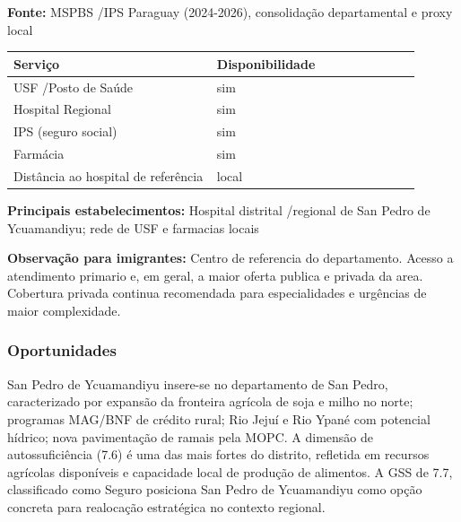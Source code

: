 \textbf{Fonte:} MSPBS /\allowbreak  IPS Paraguay (2024-2026), consolidação
departamental e proxy local

{\def\LTcaptype{none} %
\begin{longtable}{@{}>{\raggedright\arraybackslash}p{0.45\linewidth} >{\raggedright\arraybackslash}p{0.45\linewidth}@{}}
\toprule\noalign{}
Serviço & Disponibilidade \\
\midrule\noalign{}
\endhead
\bottomrule\noalign{}
\endlastfoot
USF /\allowbreak  Posto de Saúde & sim \\
Hospital Regional & sim \\
IPS (seguro social) & sim \\
Farmácia & sim \\
Distância ao hospital de referência & local \\
\end{longtable}
}

\textbf{Principais estabelecimentos:} Hospital distrital /\allowbreak  regional de
San Pedro de Ycuamandiyu; rede de USF e farmacias locais

\textbf{Observação para imigrantes:} Centro de referencia do
departamento. Acesso a atendimento primario e, em geral, a maior oferta
publica e privada da area. Cobertura privada continua recomendada para
especialidades e urgências de maior complexidade.
\newpage

\subsubsection*{Oportunidades}\label{oport-san-pedro-de-ycuamandiyu-0201}
San Pedro de Ycuamandiyu insere-se no departamento de San Pedro, caracterizado por expansão da fronteira agrícola de soja e milho no norte; programas MAG/BNF de crédito rural; Rio Jejuí e Rio Ypané com potencial hídrico; nova pavimentação de ramais pela MOPC. A dimensão de autossuficiência (7.6) é uma das mais fortes do distrito, refletida em recursos agrícolas disponíveis e capacidade local de produção de alimentos. A GSS de 7.7, classificado como Seguro posiciona San Pedro de Ycuamandiyu como opção concreta para realocação estratégica no contexto regional.

